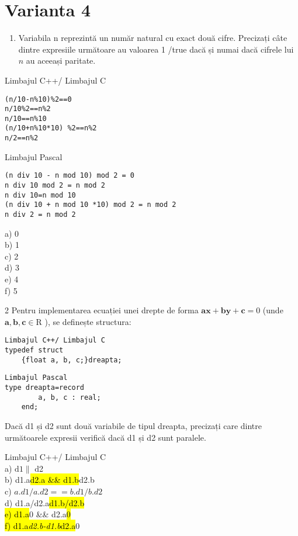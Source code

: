 \section*{Varianta 4}

\begin{enumerate}
  \item Variabila n reprezintă un număr natural cu exact două cifre. Precizați câte dintre expresiile următoare au valoarea 1 /true dacă și numai dacă cifrele lui $n$ au aceeași paritate.
\end{enumerate}

Limbajul C++/ Limbajul C

\begin{verbatim}
(n/10-n%10)%2==0
n/10%2==n%2
n/10==n%10
(n/10+n%10*10) %2==n%2
n/2==n%2
\end{verbatim}

Limbajul Pascal

\begin{verbatim}
(n div 10 - n mod 10) mod 2 = 0
n div 10 mod 2 = n mod 2
n div 10=n mod 10
(n div 10 + n mod 10 *10) mod 2 = n mod 2
n div 2 = n mod 2
\end{verbatim}

a) 0\\
b) 1\\
c) 2\\
d) 3\\
e) 4\\
f) 5

2 Pentru implementarea ecuației unei drepte de forma $\mathbf{a x + b y}+\mathbf{c}=0$ (unde $\mathbf{a}, \mathbf{b}, \mathbf{c} \in \mathrm{R}$ ), se definește structura:

\begin{verbatim}
Limbajul C++/ Limbajul C
typedef struct
    {float a, b, c;}dreapta;
\end{verbatim}

\begin{verbatim}
Limbajul Pascal
type dreapta=record
        a, b, c : real;
    end;
\end{verbatim}

Dacă d1 și d2 sunt două variabile de tipul dreapta, precizați care dintre următoarele expresii verifică dacă d1 și d2 sunt paralele.

Limbajul C++/ Limbajul C\\
a) $\mathrm{d} 1 \mathrm{\|}$ d2\\
b) d1.a\hl{d2.a \&\& d1.b}d2.b\\
c) $a . d 1 / a . d 2==b . d 1 / b . d 2$\\
d) d1.a/d2.a\hl{d1.b/d2.b\\
e) d1.a}0 \&\& d2.a\hl{0\\
f) d1.a\textit{d2.b-d1.b}d2.a}0

